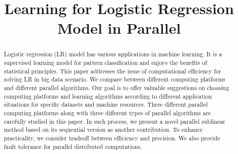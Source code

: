 \documentclass[10pt, conference, compsocconf]{IEEEtran}
\begin{document}
\title{Learning for Logistic Regression Model in Parallel}

\author{
\and
{}
\and
{}
\and
{}
\and
{}
}

\maketitle

\begin{abstract}
Logistic regression (LR) model has various applications in machine learning.
It is a supervised learning model for pattern classification and enjoys the benefits of statistical principles.
This paper addresses the issue of computational efficiency for solving LR in big data scenario.
We compare between different computing platforms and different parallel algorithms.
Our goal is to offer valuable suggestions on choosing computing platforms and learning algorithms according to different application situations for specific datasets and machine resources.
Three different parallel computing platforms along with three different types of parallel algorithms are carefully studied in this paper.
In such process, we present a novel parallel sublinear method based on its sequential version as another contribution.
To enhance practicality, we consider tradeoff between efficiency and precision.
We also provide fault tolerance for parallel distributed computations.
\end{abstract}
\end{document}
